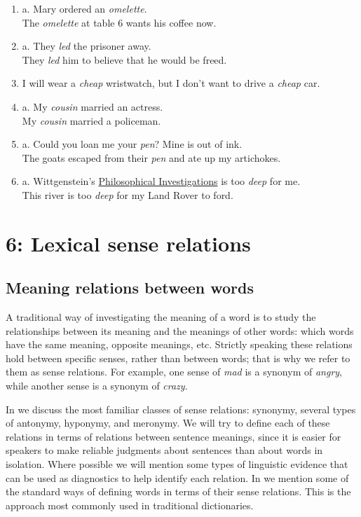 \begin{enumerate}
\item a. Mary ordered an \textit{omelette}.\\
\ex The \textit{omelette} at table 6 wants his coffee now.
\item a. They \textit{led} the prisoner away.\\
\ex They \textit{led} him to believe that he would be freed.
\item I will wear a \textit{cheap} wristwatch, but I don’t want to drive a \textit{cheap} car.
\item a. My \textit{cousin} married an actress.\\
\ex My \textit{cousin} married a policeman.
\item a. Could you loan me your \textit{pen}? Mine is out of ink.\\
\ex The goats escaped from their \textit{pen} and ate up my artichokes.
\item a. Wittgenstein’s \href{http://en.wikipedia.org/wiki/Philosophical_Investigations}{Philosophical Investigations} is too \textit{deep} for me.\\
\ex This river is too \textit{deep} for my Land Rover to ford.
\end{enumerate}

\chapter{{6}: Lexical sense relations}

\section{Meaning relations between words}\label{sec:} %

A traditional way of investigating the meaning of a word is to study the relationships between its meaning and the meanings of other words: which words have the same meaning, opposite meanings, etc. Strictly speaking these relations hold between specific senses, rather than between words; that is why we refer to them as sense relations. For example, one sense of \textit{mad} is a synonym of \textit{angry}, while another sense is a synonym of \textit{crazy}.



In  we discuss the most familiar classes of sense relations: synonymy, several types of antonymy, hyponymy, and meronymy. We will try to define each of these relations in terms of relations between sentence meanings, since it is easier for speakers to make reliable judgments about sentences than about words in isolation. Where possible we will mention some types of linguistic evidence that can be used as diagnostics to help identify each relation. In  we mention some of the standard ways of defining words in terms of their sense relations. This is the approach most commonly used in traditional dictionaries.


